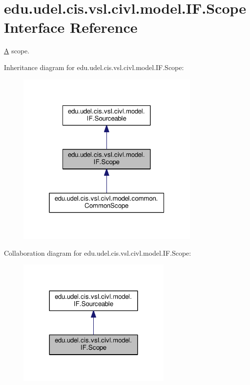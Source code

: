 \hypertarget{interfaceedu_1_1udel_1_1cis_1_1vsl_1_1civl_1_1model_1_1IF_1_1Scope}{}\section{edu.\+udel.\+cis.\+vsl.\+civl.\+model.\+I\+F.\+Scope Interface Reference}
\label{interfaceedu_1_1udel_1_1cis_1_1vsl_1_1civl_1_1model_1_1IF_1_1Scope}


\hyperlink{structA}{A} scope.  




Inheritance diagram for edu.\+udel.\+cis.\+vsl.\+civl.\+model.\+I\+F.\+Scope\+:
\nopagebreak
\begin{figure}[H]
\begin{center}
\leavevmode
\includegraphics[width=256pt]{interfaceedu_1_1udel_1_1cis_1_1vsl_1_1civl_1_1model_1_1IF_1_1Scope__inherit__graph}
\end{center}
\end{figure}


Collaboration diagram for edu.\+udel.\+cis.\+vsl.\+civl.\+model.\+I\+F.\+Scope\+:
\nopagebreak
\begin{figure}[H]
\begin{center}
\leavevmode
\includegraphics[width=215pt]{interfaceedu_1_1udel_1_1cis_1_1vsl_1_1civl_1_1model_1_1IF_1_1Scope__coll__graph}
\end{center}
\end{figure}
